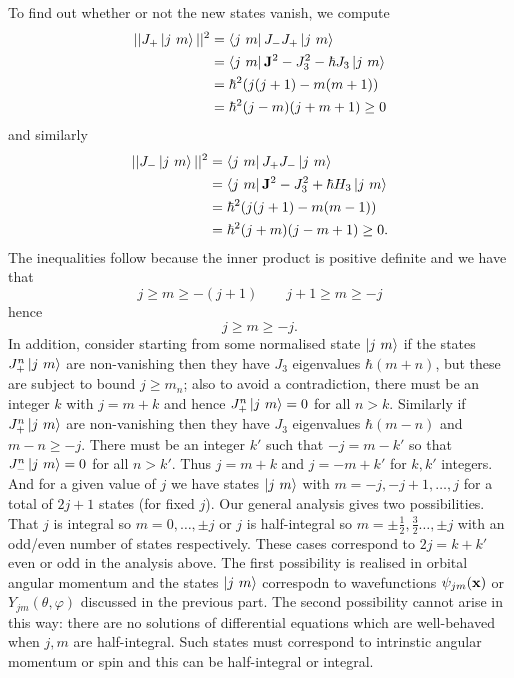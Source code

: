 \documentclass{article}
\begin{document}
To find out whether or not the new states vanish, we compute
\begin{align*}
	||J_+\ket{j\ m}||^2 &= \bra{j\ m} J_-J_+\ket{j\ m} \\
			    &= \bra{j\ m} \mathbf J^2 - J_3^2 - \hbar J_3\ket{j\ m} \\
			    &= \hbar^2(j(j+1) -m(m+1)) \\
			    &=\hbar^2(j-m)(j+m+1) \ge 0
\end{align*}
and similarly
\begin{align*}
	||J_-\ket{j\ m}||^2 &= \bra{j\ m} J_+J_- \ket{j\ m} \\
			    &= \bra{j\ m} \mathbf J^2 - J_3^2+ \hbar H_3\ket{j\ m}\\
			    &= \hbar^2(j(j+1) - m(m-1)) \\
			    &= \hbar^2(j+m)(j-m+1)\ge 0.
\end{align*}
The inequalities follow because the inner product is positive definite and we have that 
\[
  j\ge m \ge -(j+1)\qquad j+1\ge m \ge -j
\]
hence
\[
  j \ge m \ge -j.
\]
In addition, consider starting from some normalised state $ \ket{j\ m} $ if the states $ J_+^n\ket{j\ m} $ are non-vanishing then they have $ J_3 $ eigenvalues $ \hbar (m+n) $, but these are subject to bound $ j\ge m_n $; also to avoid a contradiction, there must be an integer $ k $ with $ j= m+k $ and hence $ J_+^n\ket{j\ m} = 0 $ for all $ n>k $. Similarly if $ J_+^n\ket{j\ m} $ are non-vanishing then they have $ J_3 $ eigenvalues $ \hbar(m-n) $ and $ m-n\ge -j $. There must be an integer $ k' $ such that $ -j = m-k' $ so that $ J^n_-\ket{j\ m} = 0 $ for all $ n > k'$. Thus $ j = m+k $ and $ j = -m+k' $ for $ k,k' $ integers. And for a given value of $ j $ we have states $ \ket{j\ m} $ with $ m=-j,-j+1,\dots, j $ for a total of $ 2j+1 $ states (for fixed $ j $). Our general analysis gives two possibilities. That $ j $ is integral so $ m=0,\dots, \pm j $ or $ j $ is half-integral so $ m = \pm \frac 12, \frac 32 \dots, \pm j $ with an odd/even number of states respectively. These cases correspond to $ 2j = k+k' $ even or odd in the analysis above. The first possibility is realised in orbital angular momentum and the states $ \ket{j\ m} $ correspodn to wavefunctions $ \psi_{jm}(\mathbf{x}) $ or $ Y_{jm}(\theta,\varphi) $ discussed in the previous part. The second possibility cannot arise in this way: there are no solutions of differential equations which are well-behaved when $ j,m $ are half-integral. Such states must correspond to intrinstic angular momentum or spin and this can be half-integral or integral.\par
\end{document}
